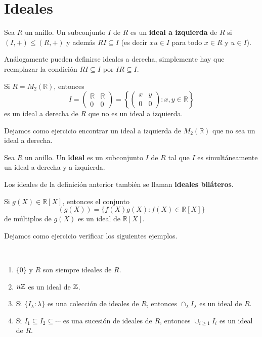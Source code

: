 \chapter{Ideales}

\begin{definition}
Sea $R$ un anillo. Un subconjunto $I$ de $R$ es un \textbf{ideal a izquierda} de $R$ si 
$(I,+)\leq (R,+)$ y además $RI\subseteq I$ (es decir $xu\in I$ para todo $x\in R$ y $u\in I$).  	
\end{definition}

Análogamente pueden definirse ideales a derecha, simplemente hay que reemplazar la condición $RI\subseteq I$ por $IR\subseteq I$.

\begin{example}
Si $R=M_{2}(\mathbb{R})$, entonces  
\[
I=\left(\begin{array}{cc}
\mathbb{R} & \mathbb{R}\\
0 & 0
\end{array}\right)=\left\{ \left(\begin{array}{cc}
x & y\\
0 & 0
\end{array}\right):x,y\in\mathbb{R}\right\} 
\]
es un ideal a derecha de $R$ que no es un ideal a izquierda. 
\end{example}

Dejamos como ejercicio encontrar un ideal a izquierda de $M_{2}(\mathbb{R})$ que no sea un ideal a derecha.

\begin{definition}
Sea $R$ un anillo. Un \textbf{ideal} es un subconjunto $I$ de $R$ tal que $I$ es simultáneamente un ideal a derecha y a izquierda. 
\end{definition} 

Los ideales de la definición anterior también se llaman \textbf{ideales biláteros}.

\begin{example}
Si $g(X)\in\mathbb{R}[X]$, entonces el conjunto 
\[
(g(X))=\{f(X)g(X):f(X)\in\mathbb{R}[X]\}
\]
de múltiplos de $g(X)$ es un ideal de $\mathbb{R}[X]$. 
\end{example}

Dejamos como ejercicio verificar los siguientes ejemplos. 
 
\begin{examples}\
\begin{enumerate}
\item $\{0\}$ y $R$ son siempre ideales de $R$.
\item $n\mathbb{Z}$ es un ideal de $\mathbb{Z}$.
\item Si $\{I_\lambda:\lambda\}$ es una colección de ideales de $R$, entonces $\cap_{\lambda}I_\lambda$ es un ideal de $R$.
\item Si $I_1\subseteq I_2\subseteq\cdots$ es una sucesión de ideales de $R$, entonces $\cup_{i\geq1}I_i$ es un ideal de $R$.
\end{enumerate}	
\end{examples}

